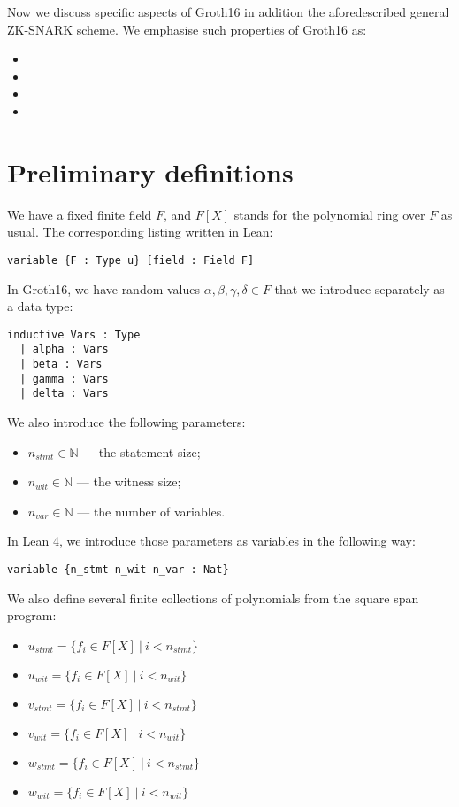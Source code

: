 \documentclass{article}
\theoremstyle{definition}
\theoremstyle{remark}
\begin{document}
Now we discuss specific aspects of Groth16 in addition the aforedescribed general ZK-SNARK scheme.
We emphasise such properties of Groth16 as:
\begin{itemize}
\item
\item
\item
\item
\end{itemize}

\section{Preliminary definitions}

We have a fixed finite field $F$, and $F[X]$ stands for the polynomial ring over $F$ as usual. The corresponding listing written in Lean:

\begin{lstlisting}
variable {F : Type u} [field : Field F]
\end{lstlisting}

In Groth16, we have random values $\alpha, \beta, \gamma, \delta \in F$ that we introduce separately as a data type:
\begin{lstlisting}
inductive Vars : Type
  | alpha : Vars
  | beta : Vars
  | gamma : Vars
  | delta : Vars
\end{lstlisting}

We also introduce the following parameters:

\begin{itemize}
\item $n_{stmt} \in \mathbb{N}$ --- the statement size;
\item $n_{wit} \in \mathbb{N}$ --- the witness size;
\item $n_{var} \in \mathbb{N}$ --- the number of variables.
\end{itemize}

In Lean 4, we introduce those parameters as variables in the following way:

\begin{lstlisting}
variable {n_stmt n_wit n_var : Nat}
\end{lstlisting}

We also define several finite collections of polynomials from the square span program:

\begin{itemize}
\item $u_{stmt} = \{ f_{i} \in F[X] \: | \: i < n_{stmt} \}$
\item $u_{wit} = \{ f_{i} \in F[X] \: | \: i < n_{wit} \}$
\item $v_{stmt} = \{ f_{i} \in F[X] \: | \: i < n_{stmt} \}$
\item $v_{wit} = \{ f_{i} \in F[X] \: | \: i < n_{wit} \}$
\item $w_{stmt} = \{ f_{i} \in F[X] \: | \: i < n_{stmt} \}$
\item $w_{wit} = \{ f_{i} \in F[X] \: | \: i < n_{wit} \}$
\end{itemize}
\end{document}
